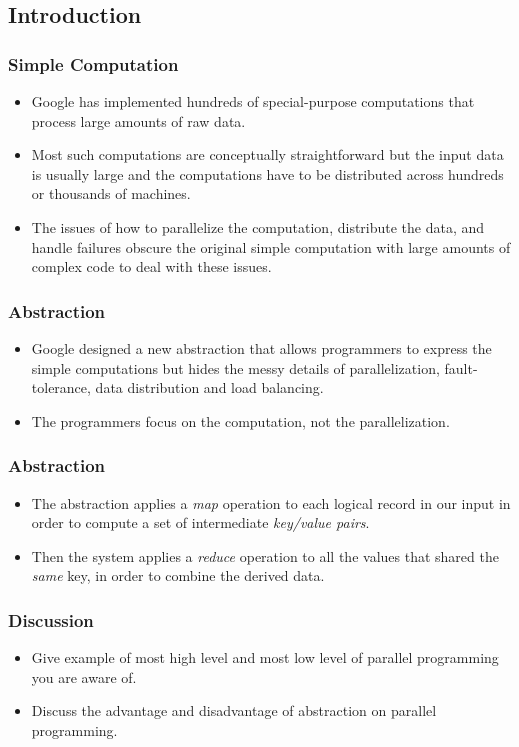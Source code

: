 \documentclass{beamer}
\begin{document}
\subsection{Introduction}

\begin{frame}
  \frametitle{Simple Computation}
  \begin{itemize}
  \item Google has implemented hundreds of special-purpose
    computations that process large amounts of raw data.
  \item Most such computations are conceptually straightforward but
    the input data is usually large and the computations have to be
    distributed across hundreds or thousands of machines.
  \item The issues of how to parallelize the computation, distribute
    the data, and handle failures obscure the original simple
    computation with large amounts of complex code to deal with these
    issues.
  \end{itemize}
\end{frame}

\begin{frame}
  \frametitle{Abstraction}
  \begin{itemize}
    \item Google designed a new abstraction that allows programmers to
      express the simple computations but hides the messy details of
      parallelization, fault-tolerance, data distribution and load
      balancing.  
    \item The programmers focus on the computation, not the
      parallelization.
  \end{itemize}
\end{frame}

\begin{frame}
  \frametitle{Abstraction}
  \begin{itemize}
    \item The abstraction applies a {\em map} operation to each
      logical record in our input in order to compute a set of
      intermediate {\em key/value pairs}.
    \item Then the system applies a {\em reduce} operation to all the
      values that shared the {\em same} key, in order to combine the
      derived data.
  \end{itemize}
\end{frame}

\begin{frame}
  \frametitle{Discussion}
  \begin{itemize}
    \item Give example of most high level and most low level of
      parallel programming you are aware of.
    \item Discuss the advantage and disadvantage of abstraction on
      parallel programming.
  \end{itemize}
\end{frame}
\end{document}
